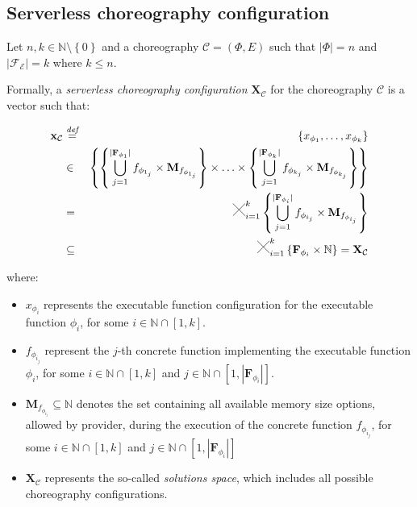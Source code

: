 \documentclass[12pt,a4paper]{report}
\newcommand{\Cross}{\mathbin{\tikz [x=2.5ex,y=2.5ex,line width=.10ex] \draw (0,0) -- (1,1) (0,1) -- (1,0);}}
\newcommand{\mathDef}{\overset{\textit{def}}{=}}
\newcommand{\N}{\mathbb{N}}
\begin{document}
\subsection{Serverless choreography configuration}

Let $n,k \in \N \setminus \left\lbrace 0 \right\rbrace$ and a choreography $\mathcal{C} = (\Phi,E)$ such that $|\Phi| = n$ and $|\mathscr{F_E}| = k$ where $k \leq n$.

Formally, a \textit{serverless choreography configuration} $\textbf{X}_{\mathcal{C}}$ for the choreography $\mathcal{C}$ is a vector such that:

\begin{eqnarray}
	\textbf{x}_{\mathcal{C}} & \mathDef & \left\lbrace x_{\phi_{1}}, \ldots, x_{\phi_{k}} \right\rbrace \nonumber \\ 
	& \in & \left\{  \left\{ \bigcup_{j=1}^{|\textbf{F}_{\phi_{1}}|} f_{\phi_{1_j}} \times \textbf{M}_{f_{\phi_{1_j}}} \right\} \times \ldots \times \left\{ \bigcup_{j=1}^{|\textbf{F}_{\phi_{k}}|} f_{\phi_{k_j}} \times \textbf{M}_{f_{\phi_{k_j}}} \right\} \right\}  \nonumber \\
	& = & \Cross_{i = 1}^k \left\{ \bigcup_{j=1}^{|\textbf{F}_{\phi_{i}}|} f_{\phi_{i_j}} \times \textbf{M}_{f_{\phi_{i_j}}} \right\} \nonumber \\
	& \subseteq & \Cross_{i = 1}^k \left\{ \textbf{F}_{\phi_{i}} \times \mathbb{N} \right\} = \textbf{X}_{\mathcal{C}}
\end{eqnarray}

where:

\begin{itemize}
	\item $x_{\phi_{i}}$ represents the executable function configuration for the executable function $\phi_{i}$, for some  $i \in \N \cap \left[ 1, k \right]$.
	
	\item $f_{\phi_{i_j}}$ represent the $j$-th concrete function implementing the executable function $\phi_{i}$, for some  $i \in \N \cap \left[ 1, k \right]$ and $j \in \N \cap \left[ 1, |\textbf{F}_{\phi_{i}}| \right]$.
	
	\item $\textbf{M}_{f_{\phi_{i_j}}} \subseteq \N$ denotes the set containing all available memory size options, allowed by provider, during the execution of the concrete function $f_{\phi_{i_j}}$, for some $i \in \N \cap \left[ 1, k \right]$ and $j \in \N \cap \left[ 1, |\textbf{F}_{\phi_{i}}| \right]$
	
	\item $\textbf{X}_{\mathcal{C}}$ represents the so-called \textit{solutions space}, which includes all possible choreography configurations.
\end{itemize}
\end{document}

